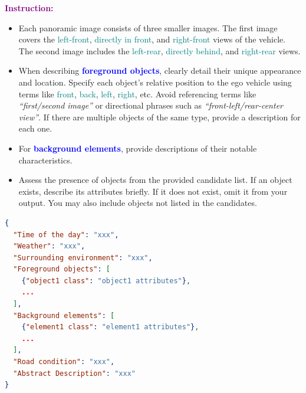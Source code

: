 \begin{tcolorbox}[myboxstyle]
\vspace{1ex}
\noindent\textbf{\textcolor{purple}{Instruction:}}
\begin{itemize}[leftmargin=10pt]
  \item Each panoramic image consists of three smaller images. The first image covers the \textcolor{teal}{left-front}, \textcolor{teal}{directly in front}, and \textcolor{teal}{right-front} views of the vehicle. The second image includes the \textcolor{teal}{left-rear}, \textcolor{teal}{directly behind}, and \textcolor{teal}{right-rear} views.
  \item When describing \textcolor{blue}{\textbf{foreground objects}}, clearly detail their unique appearance and location. Specify each object's relative position to the ego vehicle using terms like \textcolor{teal}{front}, \textcolor{teal}{back}, \textcolor{teal}{left}, \textcolor{teal}{right}, etc. Avoid referencing terms like \textit{“first/second image”} or directional phrases such as \textit{“front-left/rear-center view”}. If there are multiple objects of the same type, provide a description for each one.
  \item For \textcolor{blue}{\textbf{background elements}}, provide descriptions of their notable characteristics.
  \item Assess the presence of objects from the provided candidate list. If an object exists, describe its attributes briefly. If it does not exist, omit it from your output. You may also include objects not listed in the candidates.
\end{itemize}

\vspace{1ex}
\begin{tcolorbox}[myjsonbox,title=Please format your results as follows:]
\vspace{-4mm}
\begin{lstlisting}[language=json, basicstyle=\scriptsize\ttfamily, frame=none]
{
  "Time of the day": "xxx",
  "Weather": "xxx",
  "Surrounding environment": "xxx",
  "Foreground objects": [
    {"object1 class": "object1 attributes"},
    ...
  ],
  "Background elements": [
    {"element1 class": "element1 attributes"},
    ...
  ],
  "Road condition": "xxx",
  "Abstract Description": "xxx"
}
\end{lstlisting}
\vspace{-4mm}
\end{tcolorbox}



\end{tcolorbox}
